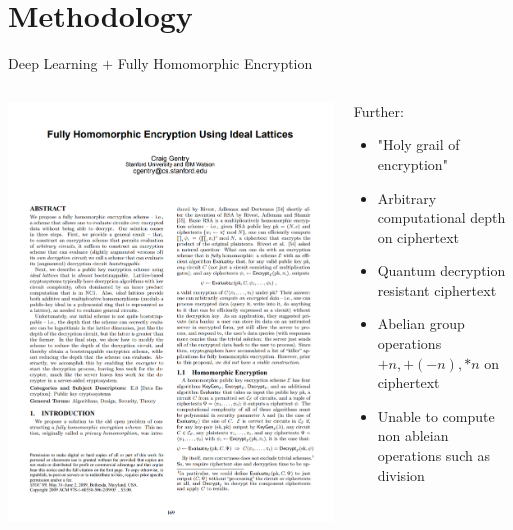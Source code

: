 \documentclass[aspectratio=169]{beamer}
\begin{document}
  \section{Methodology}

    \begin{frame}{Deep Learning $+$ Fully Homomorphic Encryption}
      \begin{columns}
        \begin{column}{0.5\textwidth}
          \includegraphics[width=0.8\linewidth]{gentry.png}
        \end{column}
        \begin{column}{0.5\textwidth}
          Further:\\[.2cm]
          \begin{itemize}
            \item "Holy grail of encryption"
            \item Arbitrary computational depth on ciphertext
            \item Quantum decryption resistant ciphertext
            \item Abelian group operations ${+n,+(-n),*n}$ on ciphertext
            \item Unable to compute non ableian operations such as division
          \end{itemize}
        \end{column}
      \end{columns}
    \end{frame}
\end{document}
